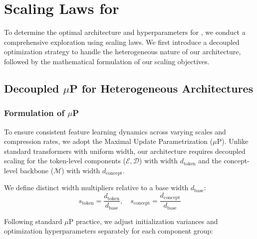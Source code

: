 \section{Scaling Laws for \ModelName{}}

To determine the optimal architecture and hyperparameters for \ModelName{}, we conduct a comprehensive exploration using scaling laws. We first introduce a decoupled optimization strategy to handle the heterogeneous nature of our architecture, followed by the mathematical formulation of our scaling objectives.

\subsection{Decoupled $\mu$P for Heterogeneous Architectures}

\subsubsection{Formulation of $\mu$P}

To ensure consistent feature learning dynamics across varying scales and compression rates, we adopt the Maximal Update Parametrization ($\mu$P). Unlike standard transformers with uniform width, our architecture requires decoupled scaling for the token-level components ($\mathcal{E}, \mathcal{D}$) with width $d_{\text{token}}$ and the concept-level backbone ($\mathcal{M}$) with width $d_{\text{concept}}$.

We define distinct width multipliers relative to a base width $d_{\text{base}}$:
\begin{equation}
    s_{\text{token}} = \frac{d_{\text{token}}}{d_{\text{base}}}, \quad s_{\text{concept}} = \frac{d_{\text{concept}}}{d_{\text{base}}}
\end{equation}

Following standard $\mu$P practice, we adjust initialization variances and optimization hyperparameters separately for each component group:

